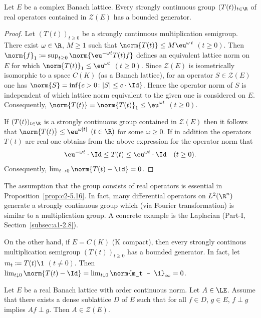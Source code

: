 \begin{proposition}\label{prop:c2-5.16}
%
Let $E$ be a complex Banach lattice.
Every strongly continuous group $(T(t))_{t \in \R}$ of real operators contained in $\mathcal{Z}(E)$ has a bounded generator.
\end{proposition}
\begin{proof}
Let $(T(t))_{t \geq 0}$ be a strongly continuous multiplication semigroup.
There exist $\omega \in \R$, $M \geq 1$ such that $\norm{T(t)} \leq M\eu^{\omega\,t}$ $(t \geq 0)$.
Then 
$\norm{f}_1 \coloneqq \sup_{t \geq 0}\norm{\eu^{-\omega t}T(t)f}$ 
defines an equivalent lattice norm on $E$ for which 
$\norm{T(t)}_1 \leq \eu^{\omega t}$ $(t \geq 0)$.
Since $\mathcal{Z}(E)$ is isometrically isomorphic to a space $C(K)$ (as a Banach lattice), for an operator $S \in \mathcal{Z}(E)$ one has $\norm{S} = \inf\{c > 0 \colon |S| \leq c \cdot \Id\}$.
Hence the operator norm of\/ $S$ is independent of which lattice norm equivalent to the given one is considered on $E$.
Consequently, $\norm{T(t)} = \norm{T(t)}_1 \leq \eu^{\omega t}$ $(t \geq 0)$.

If\/ $(T(t))_{t \in \R}$ is a strongly continuous group contained in $\mathcal{Z}(E)$ then it follows that $\norm{T(t)} \leq \eu^{\omega|t|}$ $(t \in \R)$ for some $\omega \geq 0$. 
If in addition the operators $T(t)$ are real one obtains from the above expression for the operator norm that 
\[
\eu^{- \omega t} \cdot \Id \leq T(t) \leq \eu^{\omega t} \cdot \Id \quad (t \geq 0).
\] 
Consequently, $\lim_{t \to 0}\norm{T(t) - \Id} = 0$.
\end{proof}
The assumption that the group consists of real operators is essential in Proposition~\ref{prop:c2-5.16}.
In fact, many differential operators on $L^{2}(\R^n)$ generate a strongly continuous group which (via Fourier transformation) is similar to a multiplication group.
A concrete example is the Laplacian (Part-I, Section~\ref{subsec:a1-2.8}).

On the other hand, if\/ $E = C(K)$ (K compact), then every strongly continous multiplication semigroup $(T(t))_{t \geq 0}$ has a bounded generator.
In fact, let $m_t \coloneqq T(t)\1$ $(t \neq 0)$.
Then $\lim_{t \downarrow 0}\norm{T(t) - \Id} =    \lim_{t \downarrow 0}\norm{m_t - \1}_{\infty} = 0$.
\begin{lemma}\label{lem:c2-5.17}
%
Let $E$ be a real Banach lattice with order continuous norm.
Let $A \in \LE$.
Assume that there exists a dense sublattice $D$ of\/ $E$ such that for all $f \in D$, $g \in E$, $f \perp g$ implies $Af \perp g$.
Then $A \in \mathcal{Z}(E)$.
\end{lemma}

